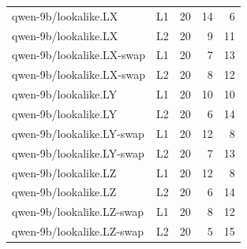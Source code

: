 \begin{longtable}{@{}llrrr@{}}
qwen-9b/\allowbreak lookalike.\allowbreak LX & L1 & 20 & 14 & 6\\
qwen-9b/\allowbreak lookalike.\allowbreak LX & L2 & 20 & 9 & 11\\
qwen-9b/\allowbreak lookalike.\allowbreak LX-swap & L1 & 20 & 7 & 13\\
qwen-9b/\allowbreak lookalike.\allowbreak LX-swap & L2 & 20 & 8 & 12\\
qwen-9b/\allowbreak lookalike.\allowbreak LY & L1 & 20 & 10 & 10\\
qwen-9b/\allowbreak lookalike.\allowbreak LY & L2 & 20 & 6 & 14\\
qwen-9b/\allowbreak lookalike.\allowbreak LY-swap & L1 & 20 & 12 & 8\\
qwen-9b/\allowbreak lookalike.\allowbreak LY-swap & L2 & 20 & 7 & 13\\
qwen-9b/\allowbreak lookalike.\allowbreak LZ & L1 & 20 & 12 & 8\\
qwen-9b/\allowbreak lookalike.\allowbreak LZ & L2 & 20 & 6 & 14\\
qwen-9b/\allowbreak lookalike.\allowbreak LZ-swap & L1 & 20 & 8 & 12\\
qwen-9b/\allowbreak lookalike.\allowbreak LZ-swap & L2 & 20 & 5 & 15\\
\end{longtable}\endgroup
